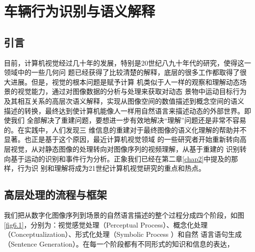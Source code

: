 \chapter{车辆行为识别与语义解释}
\label{chap6}
\section{引言}

目前，计算机视觉经过几十年的发展，特别是20世纪八九十年代的研究，使得这一领域中的一些几何问
题已经获得了比较清楚的解释，底层的很多工作都取得了很大进展。但是，视觉的根本问题是赋予计算
机类似于人一样的观察和理解动态场景的视觉能力，通过对图像数据的分析与处理来获取对动态
景物中运动目标行为及其相互关系的高层次语义解释，实现从图像空间的数值描述到概念空间的语义
描述的转换，最终达到使计算机能像人一样用自然语言来描述动态的外部世界。即使我们
全部解决了重建问题，要想进一步有效地解决“理解”问题还是非常不容易的。在实践中，人们发现三
维信息的重建对于最终图像的语义化理解的帮助并不显著。也正是基于这个原因，最近计算机视觉领域
的一些研究者开始重新转向高层视觉，从对静态图像的处理转向对图像序列的视频理解，从基于重建的
识别转向基于运动的识别和事件行为分析。正象我们已经在第二章\ref{chap2}中提及的那样，行为识
别和理解将成为21世纪计算机视觉研究的重点和热点\cite{Mubarak:2002}。

\section{高层处理的流程与框架}
\label{sec6.2}
我们把从数字化图像序列到场景的自然语言描述的整个过程分成四个阶段，如图\ref{fig6.1}，分别为：视觉感觉处理（Perceptual
Process）、概念化处理（Conceptualization）、形式化处理（Symbolic Process ）和自然
语言语句生成（Sentence Generation）。在每一个阶段都有不同形式的知识和信息的表达，
